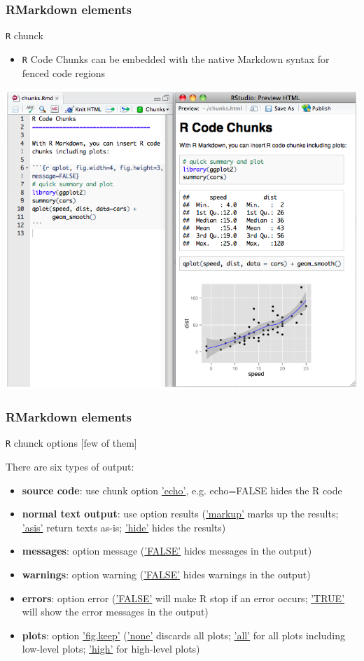 \documentclass{beamer}
\begin{document}
\begin{frame}
    \frametitle{RMarkdown elements}
	    \centering \Large \texttt{R} chunck
	\begin{itemize}
		\normalsize
		\item \texttt{R} Code Chunks can be embedded with the native Markdown syntax for fenced code regions
	\end{itemize}
    \begin{center}\includegraphics[scale=0.35]{figures/RmarkdownExample2.png}\end{center}
\end{frame}


\begin{frame}
    \frametitle{RMarkdown elements}
	    \centering \Large \texttt{R} chunck options \tiny[few of them]

	    \normalsize There are six types of output:
	\begin{itemize}
		\normalsize
		\item \textbf{source code}: use chunk option \underline{'echo'}, e.g. echo=FALSE hides the R code
	\pause
		\item \textbf{normal text output}: use option results (\underline{'markup'} marks up the results; \underline{'asis'} return texts as-is; \underline{'hide'} hides the results)
	\pause
		\item \textbf{messages}: option message (\underline{'FALSE'} hides messages in the output)
	\pause
		\item \textbf{warnings}: option warning (\underline{'FALSE'} hides warnings in the output)
	\pause
		\item \textbf{errors}: option error (\underline{'FALSE'} will make R stop if an error occurs; \underline{'TRUE'} will show the error messages in the output)
	\pause
\item \textbf{plots}: option \underline{'fig.keep'} (\underline{'none'} discards all plots; \underline{'all'} for all plots including low-level plots; \underline{'high'} for high-level plots)
	\end{itemize}
\end{frame}
\end{document}
